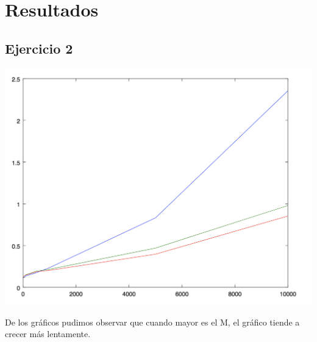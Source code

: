 \documentclass[a4paper]{article}
\begin{document}
\section{Resultados}
\subsection{Ejercicio 2}
\begin{center}
  \includegraphics[width=0.75\linewidth]{ej2.png}
\end{center}
De los gráficos pudimos observar que cuando mayor es el M, el gráfico tiende a crecer más lentamente.
\end{document}
